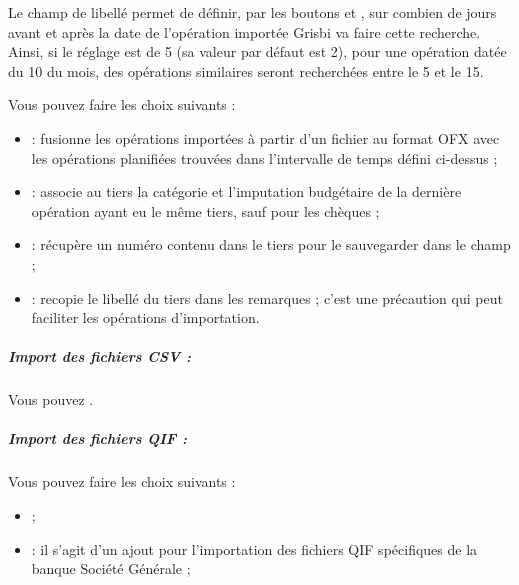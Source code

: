 Le champ de libellé  permet de définir, par les boutons \menu{+} et \menu{-}, sur combien de jours avant et après la date de l'opération importée Grisbi va faire cette recherche. Ainsi, si le réglage est de 5 (sa valeur par défaut est 2), pour une opération datée du 10 du mois, des opérations similaires seront recherchées entre le 5 et le 15.

Vous pouvez faire les choix suivants :

\begin{itemize}
	\item {} : fusionne les opérations importées à partir d'un fichier au format \gls{OFX} avec les opérations planifiées trouvées dans l'intervalle de temps défini ci-dessus ;
	\item {} : associe au tiers la catégorie et l'imputation budgétaire de la dernière opération ayant eu le même tiers, sauf pour les chèques ;
	\item {} : récupère un numéro contenu dans le tiers pour le sauvegarder dans le champ  ;
	\item {} : recopie le libellé du tiers dans les remarques ; c'est une précaution qui peut faciliter les opérations d'importation.
	
\end{itemize}


\subparagraph{Import des fichiers CSV :\label{setup-general-import-files-CSV}}

Vous pouvez .


\subparagraph{Import des fichiers QIF :\label{setup-general-import-files-QIF}}

Vous pouvez faire les choix suivants :

\begin{itemize}
	\item {} ;
	\item {} : il s'agit d'un ajout pour l'importation des fichiers QIF spécifiques de la banque Société Générale ;
		
\end{itemize}


